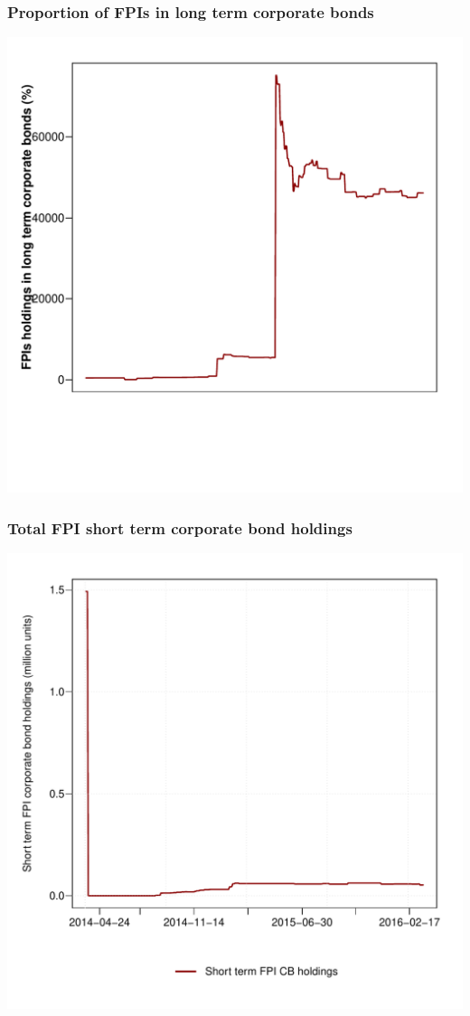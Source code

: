 \documentclass[9pt]{beamer}
\begin{document}
\begin{frame}
 \frametitle{Proportion of FPIs in long term corporate bonds}
   \centering
   \includegraphics[width=0.8\paperwidth,height=0.5\paperwidth]{../GRAPHS/fpi_sum_long_term_prop.pdf}
\end{frame}



\begin{frame}
 \frametitle{Total FPI short term corporate bond holdings}
   \centering
   \includegraphics[width=0.8\paperwidth,height=0.5\paperwidth]{../GRAPHS/fpi_sum_short_term_cbs_all.pdf}
\end{frame}
\end{document}
